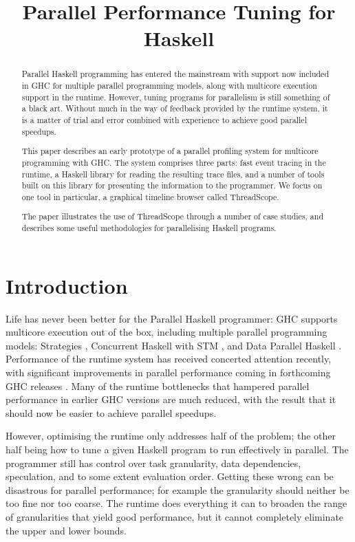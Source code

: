 \documentclass[twocolumn,9pt]{sigplanconf}
\title{Parallel Performance Tuning for Haskell}
\let\cite=\citep
\begin{document}
\maketitle

\begin{abstract}
Parallel Haskell programming has entered the mainstream with support
now included in GHC for multiple parallel programming models, along
with multicore execution support in the runtime.  However, tuning
programs for parallelism is still something of a black art.  Without
much in the way of feedback provided by the runtime system, it is a
matter of trial and error combined with experience to achieve good
parallel speedups.

This paper describes an early prototype of a parallel profiling system
for multicore programming with GHC.  The system comprises three parts:
fast event tracing in the runtime, a Haskell library for reading the
resulting trace files, and a number of tools built on this library for
presenting the information to the programmer.  We focus on one tool in
particular, a graphical timeline browser called ThreadScope.

The paper illustrates the use of ThreadScope through a number of case
studies, and describes some useful methodologies for parallelising
Haskell programs.
\end{abstract}


\section{Introduction}

Life has never been better for the Parallel Haskell programmer: GHC
supports multicore execution out of the box, including multiple
parallel programming models: Strategies \cite{spj:trin98b}, Concurrent
Haskell \cite{conchask} with STM \cite{stm}, and Data Parallel Haskell
\cite{dph}.  Performance of the runtime system has received concerted
attention recently, with significant improvements in parallel
performance coming in forthcoming GHC releases \cite{multicore-ghc}.
Many of the runtime bottlenecks that hampered parallel performance in
earlier GHC versions are much reduced, with the result that it should
now be easier to achieve parallel speedups.

However, optimising the runtime only addresses half of the problem;
the other half being how to tune a given Haskell program to run
effectively in parallel.  The programmer still has control over task
granularity, data dependencies, speculation, and to some extent
evaluation order.  Getting these wrong can be disastrous for parallel
performance; for example the granularity should neither be too fine
nor too coarse.  The runtime does everything it can to broaden the
range of granularities that yield good performance, but it cannot
completely eliminate the upper and lower bounds.
\end{document}
